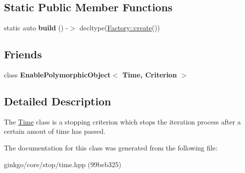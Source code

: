 \subsection*{Static Public Member Functions}
\begin{DoxyCompactItemize}
\item 
\mbox{\label{classgko_1_1stop_1_1Time_afeee63af790437143b6e607e73f41917}} 
static auto {\bfseries build} () -\/$>$ decltype(\hyperlink{classgko_1_1EnableDefaultFactory_a1d077101d9e788e6c65f088612d14cc3}{Factory\+::create}())
\end{DoxyCompactItemize}
\subsection*{Friends}
\begin{DoxyCompactItemize}
\item 
\mbox{\label{classgko_1_1stop_1_1Time_a0ad01ce3f53eb68b4841ead2a7bf5406}} 
class {\bfseries Enable\+Polymorphic\+Object$<$ Time, Criterion $>$}
\end{DoxyCompactItemize}


\subsection{Detailed Description}
The \hyperlink{classgko_1_1stop_1_1Time}{Time} class is a stopping criterion which stops the iteration process after a certain amout of time has passed. 

The documentation for this class was generated from the following file\+:\begin{DoxyCompactItemize}
\item 
ginkgo/core/stop/time.\+hpp (99beb325)\end{DoxyCompactItemize}
